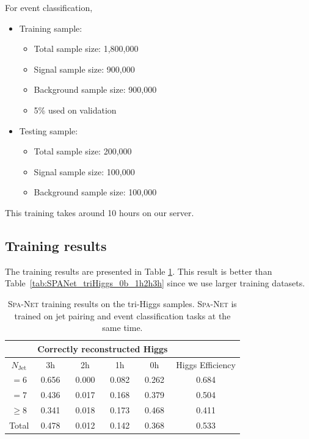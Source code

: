 \documentclass[12pt]{article}
\begin{document}
        For event classification,
        \begin{itemize}
            \item Training sample:
            \begin{itemize}
                \item Total sample size: 1,800,000
                \item Signal sample size: 900,000
                \item Background sample size: 900,000
                \item 5\% used on validation
            \end{itemize}
            \item Testing sample:
            \begin{itemize}
                \item Total sample size: 200,000
                \item Signal sample size: 100,000
                \item Background sample size: 100,000
            \end{itemize}
        \end{itemize}

        This training takes around 10 hours on our server.
    \subsection{Training results}%
    \label{sub:training_results}
        The training results are presented in Table \ref{tab:SPANet_triHiggs_0b_cls_pairing_results}. This result is better than Table~\ref{tab:SPANet_triHiggs_0b_1h2h3h} since we use larger training datasets.

        \begin{table}[htpb]
            \centering
            \caption{\textsc{Spa-Net} training results on the tri-Higgs samples. \textsc{Spa-Net} is trained on jet pairing and event classification tasks at the same time.}
            \label{tab:SPANet_triHiggs_0b_cls_pairing_results}
            \begin{tabular}{c|cccc|c}
            \multicolumn{1}{l|}{} & \multicolumn{4}{c|}{Correctly reconstructed Higgs} & \multicolumn{1}{l}{} \\ \hline
            $N_\text{Jet}$        & 3h          & 2h         & 1h         & 0h         & Higgs Efficiency     \\ \hline
            $=6$                  & 0.656       & 0.000      & 0.082      & 0.262      & 0.684                \\
            $=7$                  & 0.436       & 0.017      & 0.168      & 0.379      & 0.504                \\
            $\ge 8$               & 0.341       & 0.018      & 0.173      & 0.468      & 0.411                \\ \hline
            Total                 & 0.478       & 0.012      & 0.142      & 0.368      & 0.533
            \end{tabular}

        \end{table}
\end{document}
